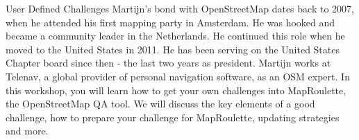 %
{User Defined Challenges}%
{Martijn's bond with OpenStreetMap dates back to 2007, when he attended his first mapping party in Amsterdam. He was hooked and became a community leader in the Netherlands. He continued this role when he moved to the United States in 2011. He has been serving on the United States Chapter board since then - the last two years as president. Martijn works at Telenav, a global provider of personal navigation software, as an OSM expert. }%
{In this workshop, you will learn how to get your own challenges into MapRoulette, the OpenStreetMap QA tool. We will discuss the key elements of a good challenge, how to prepare your challenge for MapRoulette, updating strategies and more.
}%
